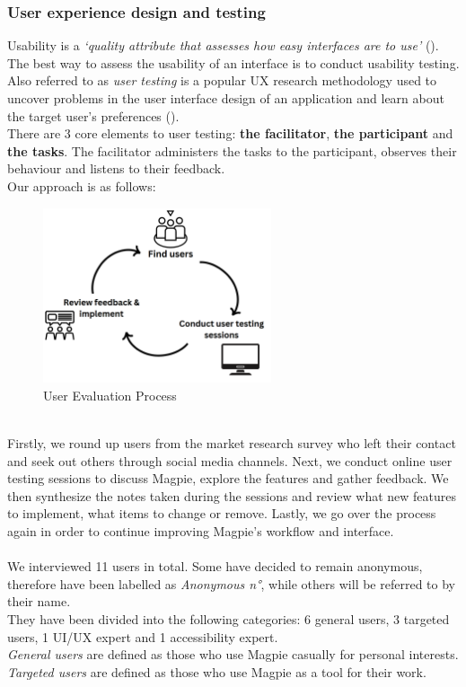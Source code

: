 \subsubsection{User experience design and testing}
Usability is a \emph{`quality attribute that assesses how easy interfaces are to use'} (\cite{usabilitycomponentsnielsen}). The best way to assess the usability of an interface is to conduct usability testing.\\
Also referred to as \emph{user testing} is a popular UX research methodology used to uncover problems in the user interface design of an application and learn about the target user's preferences (\cite{usertestingdefinition}).\\

\noindent There are 3 core elements to user testing: \textbf{the facilitator}, \textbf{the participant} and \textbf{the tasks}. The facilitator administers the tasks to the participant, observes their behaviour and listens to their feedback.\\

\noindent Our approach is as follows:
\begin{figure}[h!]
    \centering
    \includegraphics[width=0.6\textwidth]{images/user-eval-process.png}
    \caption{User Evaluation Process}
\end{figure}\\
Firstly, we round up users from the market research survey who left their contact and seek out others through social media channels. Next, we conduct online user testing sessions to discuss Magpie, explore the features and gather feedback. We then synthesize the notes taken during the sessions and review what new features to implement, what items to change or remove. Lastly, we go over the process again in order to continue improving Magpie's workflow and interface.\\ \\
We interviewed 11 users in total. Some have decided to remain anonymous, therefore have been labelled as \emph{Anonymous n°}, while others will be referred to by their name. \\ They have been divided into the following categories: 6 general users, 3 targeted users, 1 UI/UX expert and 1 accessibility expert.\\
\emph{General users} are defined as those who use Magpie casually for personal interests.\\ \emph{Targeted users} are defined as those who use Magpie as a tool for their work.

